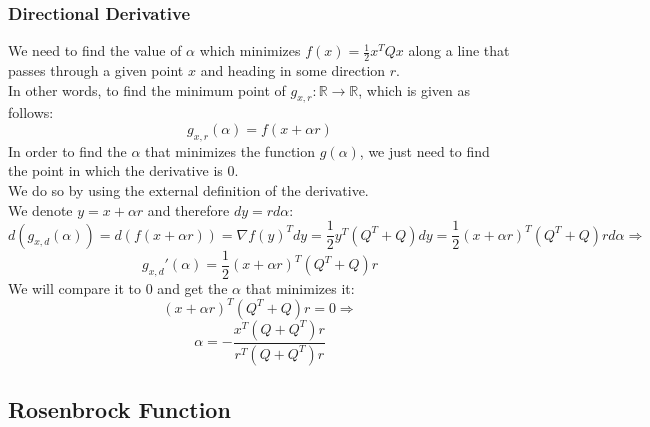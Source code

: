 \documentclass[12pt]{article}
\begin{document}
\subsubsection{Directional Derivative}
We need to find the value of $\alpha$ which minimizes $f(x)=\frac{1}{2} x^T Q x$ along a line that passes through a given point $x$ and heading in some direction $r$.\\
In other words, to find the minimum point of $g_{x,r} : \mathbb{R} \rightarrow \mathbb{R}$, which is given as follows:\\
$$g_{x,r}(\alpha) = f(x + \alpha r)$$
In order to find the $\alpha$ that minimizes the function $g(\alpha)$, we just need to find the point in which the derivative is 0.\\
We do so by using the external definition of the derivative.\\
We denote $y=x + \alpha r$ and therefore $dy= r d\alpha$:\\
$$d(g_{x,d}(\alpha)) = d(f(x + \alpha r)) = \nabla f(y)^T dy = \frac{1}{2} y^T (Q^T + Q) dy = \frac{1}{2} (x + \alpha r)^T (Q^T + Q) r d\alpha \Rightarrow$$
$$g_{x,d}'(\alpha) = \frac{1}{2} (x + \alpha r)^T (Q^T + Q)r$$
We will compare it to 0 and get the $\alpha$ that minimizes it:
$$(x + \alpha r)^T (Q^T + Q)r=0 \Rightarrow$$
$$\alpha = -\frac{x^T(Q + Q^T)r}{r^T(Q + Q^T)r}$$

\subsection{Rosenbrock Function}
\end{document}
